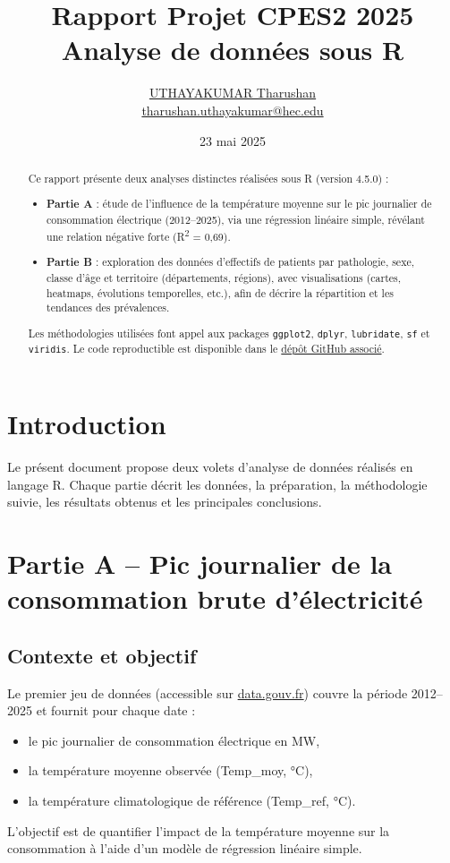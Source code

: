 \documentclass[12pt,a4paper]{article}
\title{Rapport Projet CPES2 2025\\Analyse de données sous R}
\author{\href{https://www.linkedin.com/in/utharushan/}{UTHAYAKUMAR Tharushan}\\\href{mailto:tharushan.uthayakumar@hec.edu}{tharushan.uthayakumar@hec.edu}}
\date{23 mai 2025}
\begin{document}
\maketitle

\begin{abstract}
Ce rapport présente deux analyses distinctes réalisées sous R (version 4.5.0) :
\begin{itemize}
  \item \textbf{Partie A} : étude de l'influence de la température moyenne sur le pic journalier de consommation électrique (2012--2025), via une régression linéaire simple, révélant une relation négative forte (R\textsuperscript{2} = 0,69).
  \item \textbf{Partie B} : exploration des données d'effectifs de patients par pathologie, sexe, classe d'âge et territoire (départements, régions), avec visualisations (cartes, heatmaps, évolutions temporelles, etc.), afin de décrire la répartition et les tendances des prévalences.
\end{itemize}
Les méthodologies utilisées font appel aux packages \texttt{ggplot2}, \texttt{dplyr}, \texttt{lubridate}, \texttt{sf} et \texttt{viridis}. Le code reproductible est disponible dans le \href{https://github.com/Utharushan/Projet-Final-Intro-a-R-CPES-Saclay}{dépôt GitHub associé}.
\end{abstract}

\newpage
\tableofcontents
\newpage

\section*{Introduction}
Le présent document propose deux volets d'analyse de données réalisés en langage R. Chaque partie décrit les données, la préparation, la méthodologie suivie, les résultats obtenus et les principales conclusions.

\section{Partie A -- Pic journalier de la consommation brute d'électricité}
\subsection{Contexte et objectif}
Le premier jeu de données (accessible sur \href{https://www.data.gouv.fr/fr/datasets/pic-journalier-de-la-consommation-brute-delectricite/}{data.gouv.fr}) couvre la période 2012--2025 et fournit pour chaque date :
\begin{itemize}
  \item le pic journalier de consommation électrique en MW,
  \item la température moyenne observée (Temp\_moy, °C),
  \item la température climatologique de référence (Temp\_ref, °C).
\end{itemize}
L'objectif est de quantifier l'impact de la température moyenne sur la consommation à l'aide d'un modèle de régression linéaire simple.
\end{document}
